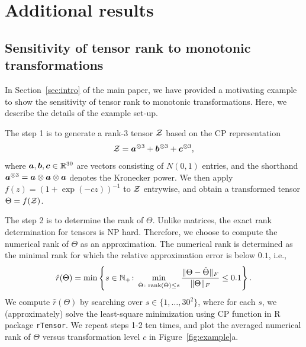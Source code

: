 \documentclass[11pt]{article}
\theoremstyle{plain}
\theoremstyle{definition}
\def\rank{\textup{rank}}
\begin{document}
\section{Additional results}\label{sec:additional}
\subsection{Sensitivity of tensor rank to monotonic transformations}
In Section~\ref{sec:intro} of the main paper, we have provided a motivating example to show the sensitivity of tensor rank to monotonic transformations. Here, we describe the details of the example set-up. 

The step 1 is to generate a rank-3 tensor $\mathcal{Z}$ based on the CP representation
\[
\mathcal{Z}=\bm{a}^{\otimes 3}+\bm{b}^{\otimes 3}+\bm{c}^{\otimes 3},
\]
where $\bm{a},\bm{b},\bm{c}\in\mathbb{R}^{30}$ are vectors consisting of $N(0,1)$ entries, and the shorthand $\bm{a}^{\otimes 3}=\bm{a}\otimes \bm{a}\otimes \bm{a}$ denotes the Kronecker power. We then apply $f(z)=(1+\exp(-cz))^{-1}$ to $\mathcal{Z}$ entrywise, and obtain a transformed tensor $\Theta=f(\mathcal{Z})$. 

The step 2 is to determine the rank of $\Theta$. Unlike matrices, the exact rank determination for tensors is NP hard. Therefore, we choose to compute the numerical rank of $\Theta$ as an approximation.  The numerical rank is determined as the minimal rank for which the relative approximation error is below $0.1$, i.e.,
\begin{equation}\label{eq:numeric}
 \hat r(\Theta)=\min\left\{s\in\mathbb{N}_{+}\colon \min_{\hat \Theta\colon \rank(\hat \Theta)\leq s}{\FnormSize{}{\Theta-\hat \Theta}\over \FnormSize{}{\Theta}} \leq 0.1\right\}.
\end{equation}
We compute $\hat r(\Theta)$ by searching over $s\in\{1,\ldots,30^2\}$, where for each $s$, we (approximately) solve the least-square minimization using CP function in R package {\tt rTensor}. 
We repeat steps 1-2 ten times, and plot the averaged numerical rank of $\Theta$ versus transformation level $c$ in Figure~\ref{fig:example}a.  
\end{document}

